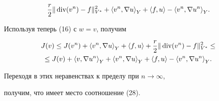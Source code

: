 \begin{pf}
\begin{multline*}
\frac{r}{2}\|\Div (v^{n}) - f\|^{2}_{V^{*}} +


{\langle v^{n},\nabla u \rangle}_{Y} + {\langle f,u \rangle} - 


{\langle v^{n},\nabla u^{n} \rangle}_{Y}.


\end{multline*}


Используя теперь (16) с $w = v$, получим


\begin{multline*}


J(v) \le J(v^{n}) + {\langle v^{n},\nabla u \rangle}_{Y} + 


{\langle f,u \rangle} 


+ \frac{r}{2}\|\Div (v^{n}) - f\|^{2}_{V^{*}} \le \\


\le J(v) + {\langle v,\nabla u^{n} \rangle}_{Y} + 


{\langle v^{n},\nabla u \rangle}_{Y} + 


{\langle f,u \rangle} - {\langle v^{n},\nabla u^{n} \rangle}_{Y}.


\end{multline*}


Переходя в этих неравенствах к пределу при $n \to \infty$, 


получим, что имеет место соотношение (28).


\end{pf}





